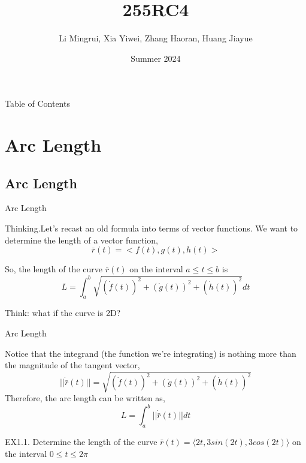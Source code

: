 \documentclass{beamer}
\title{\LARGE 255RC4}
\author{ Li Mingrui, Xia Yiwei, Zhang Haoran, Huang Jiayue}
\date{Summer 2024}
\begin{document}
\maketitle


\begin{frame}[t]{Table of Contents}
        \tableofcontents
    \end{frame}



    \section{Arc Length}
    
    \subsection{Arc Length}
    \begin{frame}[t]{Arc Length}
        \begin{block}
            \par \textcolor{yy}{Thinking.}Let's recast an old formula into terms of vector functions. We want to determine the length of a vector function,
            \begin{equation*}
                 \bar{r} (t) = <f(t) , g(t)  , h(t) >
            \end{equation*}
             
    So, the length of the curve  $\bar{r} (t) $  on the interval $ a \le t \le b $  is
    \begin{equation*}
        L = \int_{a}^{b}{\sqrt{(\dot{f}(t))^2 + (\dot{g}(t))^2 + (\dot{h}(t))^2}dt}
    \end{equation*}
   
        \end{block}
    Think: what if the curve is 2D?
            
        
    \end{frame}
    
    \begin{frame}{Arc Length}
        \begin{block}
        \par Notice that the integrand (the function we’re integrating) is nothing more than the magnitude of the tangent vector,
    \begin{equation*}
        ||\dot{\bar{r}}(t)|| = \sqrt{(\dot{f}(t))^2 + (\dot{g}(t))^2 + (\dot{h}(t))^2}
    \end{equation*}
    Therefore, the arc length can be written as,
    \begin{equation*}
        L = \int_{a}^{b}{||\dot{\bar{r}}(t)||dt}
    \end{equation*}
        \end{block}
    \par \textcolor{yy}{EX1.1.}
       Determine the length of the curve $\bar{r} (t) =⟨2t,3sin(2t),3cos(2t)⟩$ on the interval  $0 \le t \le 2\pi$
    \end{frame}
    
\end{document}
